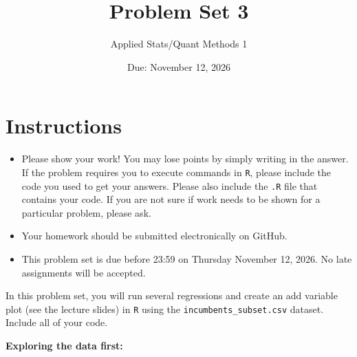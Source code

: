 \documentclass[12pt,letterpaper]{article}
\title{Problem Set 3}
\date{Due: November 12, 2026}
\author{Applied Stats/Quant Methods 1}
\begin{document}
	\maketitle
	\section*{Instructions}
	\begin{itemize}
		\item Please show your work! You may lose points by simply writing in the answer. If the problem requires you to execute commands in \texttt{R}, please include the code you used to get your answers. Please also include the \texttt{.R} file that contains your code. If you are not sure if work needs to be shown for a particular problem, please ask.
	\item Your homework should be submitted electronically on GitHub.
	\item This problem set is due before 23:59 on Thursday November 12, 2026. No late assignments will be accepted.

	\end{itemize}
		\vspace{.25cm}
	
\noindent In this problem set, you will run several regressions and create an add variable plot (see the lecture slides) in \texttt{R} using the \texttt{incumbents\_subset.csv} dataset. Include all of your code.\vspace{.25cm}

\textbf{Exploring the data first:}
	
		 
\end{document}
